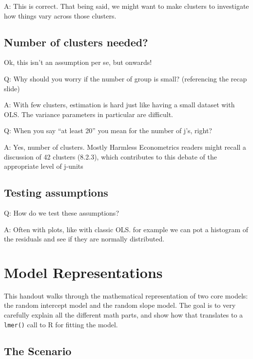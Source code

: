 \documentclass[
  letterpaper,
  DIV=11,
  numbers=noendperiod]{scrreprt}
\begin{document}
A: This is correct. That being said, we might want to make clusters to
investigate how things vary across those clusters.

\hypertarget{number-of-clusters-needed}{%
\section{Number of clusters needed?}\label{number-of-clusters-needed}}

Ok, this isn't an assumption per se, but onwards!

Q: Why should you worry if the number of group is small? (referencing
the recap slide)

A: With few clusters, estimation is hard just like having a small
dataset with OLS. The variance parameters in particular are difficult.

Q: When you say ``at least 20'' you mean for the number of j's, right?

A: Yes, number of clusters. Mostly Harmless Econometrics readers might
recall a discussion of 42 clusters (8.2.3), which contributes to this
debate of the appropriate level of j-units

\hypertarget{testing-assumptions}{%
\section{Testing assumptions}\label{testing-assumptions}}

Q: How do we test these assumptions?

A: Often with plots, like with classic OLS. for example we can pot a
histogram of the residuals and see if they are normally distributed.

\hypertarget{model-representations}{%
\chapter{Model Representations}\label{model-representations}}

This handout walks through the mathematical representation of two core
models: the random intercept model and the random slope model. The goal
is to very carefully explain all the different math parts, and show how
that translates to a \texttt{lmer()} call to R for fitting the model.

\hypertarget{the-scenario}{%
\section{The Scenario}\label{the-scenario}}
\end{document}
